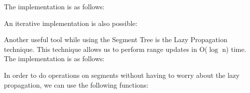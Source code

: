 The implementation is as follows:



An iterative implementation is also possible:

%


Another useful tool while using the Segment Tree is the Lazy Propagation technique. This technique allows us to perform range updates in O($\log$ n) time. The implementation is as follows:

In order to do operations on segments without having to worry about the lazy propagation, we can use the following functions:

